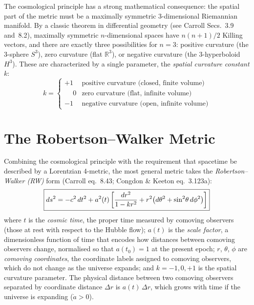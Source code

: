 The cosmological principle has a strong mathematical consequence:
the spatial part of the metric must be a maximally symmetric
3-dimensional Riemannian manifold.  By a classic theorem in differential
geometry (see Carroll Secs.~3.9 and~8.2), maximally symmetric $n$-dimensional
spaces have $n(n+1)/2$ Killing vectors, and there are exactly three
possibilities for $n = 3$: positive curvature (the 3-sphere $S^3$),
zero curvature (flat $\mathbb{R}^3$), or negative curvature (the
3-hyperboloid $H^3$).  These are characterized by a single parameter,
the \emph{spatial curvature constant} $k$:
\begin{equation}
    k = \begin{cases}
    +1 & \text{positive curvature (closed, finite volume)} \\
    \phantom{+}0 & \text{zero curvature (flat, infinite volume)} \\
    -1 & \text{negative curvature (open, infinite volume)}
    \end{cases}
    \label{eq:k_values}
\end{equation}


\section{The Robertson--Walker Metric}
\label{sec:rw_metric}

Combining the cosmological principle with the requirement that spacetime
be described by a Lorentzian 4-metric, the most general metric takes the
\emph{Robertson--Walker (RW)} form (Carroll eq.~8.43; Congdon \& Keeton
eq.~3.123a):
\begin{equation}
    \boxed{
    ds^2 = -c^2\, dt^2
    + a^2(t) \left[\frac{dr^2}{1 - kr^2}
    + r^2 \bigl(d\theta^2 + \sin^2\!\theta\, d\phi^2\bigr)\right]
    }
    \label{eq:rw_metric}
\end{equation}
where $t$ is the \emph{cosmic time}, the proper time measured by comoving
observers (those at rest with respect to the Hubble flow); $a(t)$ is the
\emph{scale factor}, a dimensionless function of time that encodes how
distances between comoving observers change, normalised so that
$a(t_0) = 1$ at the present epoch; $r$, $\theta$, $\phi$ are
\emph{comoving coordinates}, the coordinate labels assigned to comoving
observers, which do not change as the universe expands; and
$k = -1, 0, +1$ is the spatial curvature parameter.  The physical
distance between two comoving observers separated by coordinate distance
$\Delta r$ is $a(t)\,\Delta r$, which grows with time if the universe is
expanding ($\dot{a} > 0$).

